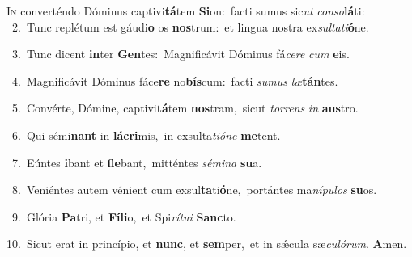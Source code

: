\lettrine{\initial\textcolor{\initialcolor}{I}}{n} converténdo Dóminus captivi\-\textbf{tá}\-tem \textbf{Si}\-on:~\star facti sumus sic\textit{ut} \textit{con}\-\textit{so}\textbf{lá}ti:\\
{\numbfont\textcolor{\numbcolor}{~2.}}~Tunc replétum est gáudi\textbf{o} os \textbf{nos}\-trum:~\star et lingua nostra ex\-\textit{sul}\-\textit{ta}\textit{ti}\textbf{ó}ne.\par
{\numbfont\textcolor{\numbcolor}{~3.}}~Tunc dicent \textbf{in}\-ter \textbf{Gen}\-tes:~\star Magnificávit Dóminus fá\-\textit{ce}\-\textit{re} \textit{cum} \textbf{e}\-is.\par
{\numbfont\textcolor{\numbcolor}{~4.}}~Magnificávit Dóminus fáce\textbf{re} no\-\textbf{bís}\-cum:~\star facti \textit{su}\-\textit{mus} \textit{læ}\-\textbf{tán}tes.\par
{\numbfont\textcolor{\numbcolor}{~5.}}~Convérte, Dómine, captivi\-\textbf{tá}\-tem \textbf{nos}\-tram,~\star sicut \textit{tor}\-\textit{rens} \textit{in} \textbf{aus}\-tro.\par
{\numbfont\textcolor{\numbcolor}{~6.}}~Qui sémi\textbf{nant} in \textbf{lá}\-\textbf{cri}mis,~\star in exsulta\-\textit{ti}\-\textit{ó}\textit{ne} \textbf{me}\-tent.\par
{\numbfont\textcolor{\numbcolor}{~7.}}~Eúntes \textbf{i}\-bant et \textbf{fle}\-bant,~\star mitténtes \textit{sé}\-\textit{mi}\textit{na} \textbf{su}\-a.\par
{\numbfont\textcolor{\numbcolor}{~8.}}~Veniéntes autem vénient cum exsul\-\textbf{ta}\-ti\-\textbf{ó}\-ne,~\star portántes ma\-\textit{ní}\-\textit{pu}\textit{los} \textbf{su}\-os.\par
{\numbfont\textcolor{\numbcolor}{~9.}}~Glória \textbf{Pa}\-tri, et \textbf{Fí}\-\textbf{li}o,~\star et Spi\-\textit{rí}\-\textit{tu}\textit{i} \textbf{Sanc}\-to.\par
{\numbfont\textcolor{\numbcolor}{10.}}~Sicut erat in princípio, et \textbf{nunc}\-, et \textbf{sem}\-per,~\star et in sǽcula sæ\-\textit{cu}\-\textit{ló}\textit{rum}. \textbf{A}\-men.\par

